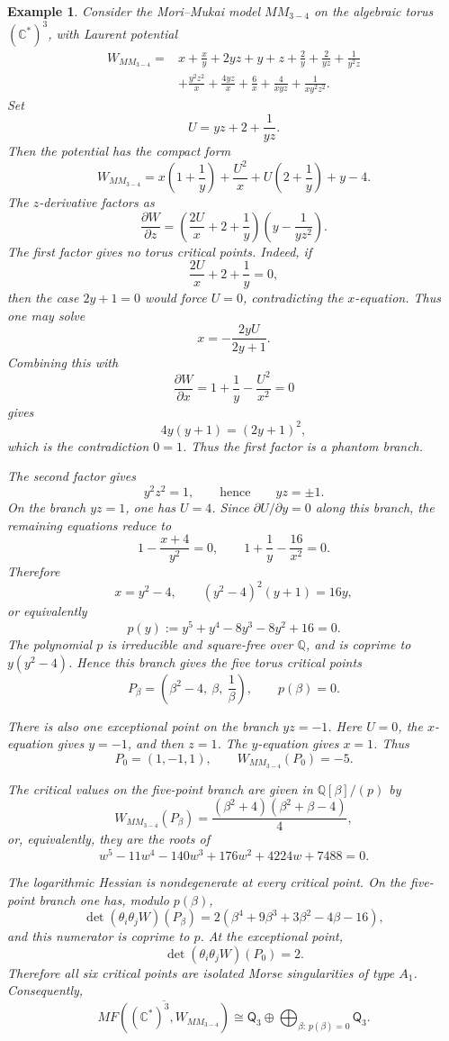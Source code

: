 \documentclass[11pt]{amsart}
\newtheorem{example}{Example}[section]
\newcommand{\MorseCat}[1]{\mathsf{Q}_{#1}}
\begin{document}
\begin{example}
Consider the Mori--Mukai model $MM_{3-4}$ on the algebraic torus
$(\mathbb{C}^*)^3$, with Laurent potential
\begin{align*}
W_{MM_{3-4}}={}&x+\frac{x}{y}+2yz+y+z+\frac{2}{y}
+\frac{2}{yz}+\frac{1}{y^2z} \\
&+\frac{y^2z^2}{x}+\frac{4yz}{x}+\frac{6}{x}
+\frac{4}{xyz}+\frac{1}{xy^2z^2}.
\end{align*}
Set
\[
U=yz+2+\frac{1}{yz}.
\]
Then the potential has the compact form
\[
W_{MM_{3-4}}
=x\left(1+\frac{1}{y}\right)+\frac{U^2}{x}
+U\left(2+\frac{1}{y}\right)+y-4.
\]
The $z$-derivative factors as
\[
\frac{\partial W}{\partial z}
=\left(\frac{2U}{x}+2+\frac{1}{y}\right)
\left(y-\frac{1}{yz^2}\right).
\]
The first factor gives no torus critical points. Indeed, if
\[
\frac{2U}{x}+2+\frac{1}{y}=0,
\]
then the case $2y+1=0$ would force $U=0$, contradicting the
$x$-equation. Thus one may solve
\[
x=-\frac{2yU}{2y+1}.
\]
Combining this with
\[
\frac{\partial W}{\partial x}
=1+\frac{1}{y}-\frac{U^2}{x^2}=0
\]
gives
\[
4y(y+1)=(2y+1)^2,
\]
which is the contradiction $0=1$. Thus the first factor is a phantom branch.

The second factor gives
\[
y^2z^2=1,
\qquad\text{hence}\qquad
yz=\pm1.
\]
On the branch $yz=1$, one has $U=4$. Since $\partial U/\partial y=0$ along
this branch, the remaining equations reduce to
\[
1-\frac{x+4}{y^2}=0,
\qquad
1+\frac{1}{y}-\frac{16}{x^2}=0.
\]
Therefore
\[
x=y^2-4,
\qquad
(y^2-4)^2(y+1)=16y,
\]
or equivalently
\[
p(y):=y^5+y^4-8y^3-8y^2+16=0.
\]
The polynomial $p$ is irreducible and square-free over $\mathbb{Q}$, and is
coprime to $y(y^2-4)$. Hence this branch gives the five torus critical points
\[
P_\beta=\left(\beta^2-4,\ \beta,\ \frac{1}{\beta}\right),
\qquad
p(\beta)=0.
\]

There is also one exceptional point on the branch $yz=-1$. Here $U=0$, the
$x$-equation gives $y=-1$, and then $z=1$. The $y$-equation gives $x=1$.
Thus
\[
P_0=(1,-1,1),
\qquad
W_{MM_{3-4}}(P_0)=-5.
\]

The critical values on the five-point branch are given in
$\mathbb{Q}[\beta]/(p)$ by
\[
W_{MM_{3-4}}(P_\beta)
=\frac{(\beta^2+4)(\beta^2+\beta-4)}{4},
\]
or, equivalently, they are the roots of
\[
w^5-11w^4-140w^3+176w^2+4224w+7488=0.
\]

The logarithmic Hessian is nondegenerate at every critical point. On the
five-point branch one has, modulo $p(\beta)$,
\[
\det(\theta_i\theta_jW)(P_\beta)
=2(\beta^4+9\beta^3+3\beta^2-4\beta-16),
\]
and this numerator is coprime to $p$. At the exceptional point,
\[
\det(\theta_i\theta_jW)(P_0)=2.
\]
Therefore all six critical points are isolated Morse singularities of type
$A_1$. Consequently,
\[
\overline{MF((\mathbb{C}^*)^3,W_{MM_{3-4}})}
\cong \MorseCat{3} \oplus \bigoplus_{\beta:\,p(\beta)=0}\MorseCat{3}.
\]
\end{example}
\end{document}
